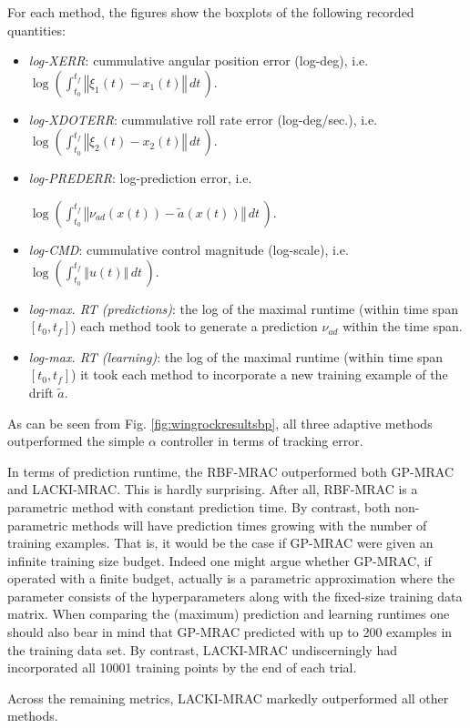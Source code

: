 \documentclass{article} %
\theoremstyle{definition}
\theoremstyle{remark}
\newcommand{\norm}[1]{\left\Vert#1\right\Vert}
\newcommand{\hexp}{{ \alpha }}%
\newcommand{\dt}{\ensuremath{ \, dt \,}}
\begin{document}
	
	For each method, the figures show the boxplots of the following recorded quantities: 
	\begin{itemize}
		\item \textit{log-XERR}: cummulative angular position error (log-deg), i.e. $\log(\int_{t_0}^{t_f} \norm{\xi_1(t) - x_1 (t)} \dt )$.
		\item \textit{log-XDOTERR}:  cummulative roll rate error (log-deg/sec.), i.e. $\log(\int_{t_0}^{t_f} \norm{\xi_2(t) - x_2 (t)} \dt )$.
		\item \textit{log-PREDERR}: log-prediction error, i.e. 
		
		$\log(\int_{t_0}^{t_f} \norm{\nu_{ad}(x(t)) - \tilde a(x(t))} \dt )$.
		\item \textit{log-CMD}: cummulative control magnitude (log-scale), i.e. $\log(\int_{t_0}^{t_f} \norm{u(t)} \dt )$.
		\item \textit{log-max. RT (predictions)}: the log of the maximal runtime (within time span $[t_0,t_f]$) each method took to generate a prediction $\nu_{ad}$ within the time span.
		\item \textit{log-max. RT (learning)}: the log of the maximal runtime (within time span $[t_0,t_f]$) it took each method to incorporate a new training example of the drift $\tilde a$.
	\end{itemize}
	
	As can be seen from Fig. \ref{fig:wingrockresultsbp}, all three adaptive methods outperformed the simple $\hexp$ controller in terms of tracking error. 
	
	In terms of prediction runtime, the RBF-MRAC outperformed both GP-MRAC and LACKI-MRAC. This is hardly surprising. After all, RBF-MRAC is a parametric method with constant prediction time. By contrast, both non-parametric methods will have prediction times growing with the number of training examples.
That is, it would be the case if GP-MRAC were given an infinite training size budget. Indeed one might argue whether GP-MRAC, if operated with a finite budget, actually is a parametric approximation where the parameter consists of the hyperparameters along with the fixed-size training data matrix. When comparing the (maximum) prediction and learning runtimes one should also bear in mind that GP-MRAC predicted with up to 200 examples in the training data set. By contrast, LACKI-MRAC undiscerningly had incorporated all 10001 training points by the end of each trial.

Across the remaining metrics, LACKI-MRAC markedly outperformed all other methods.
\end{document}
